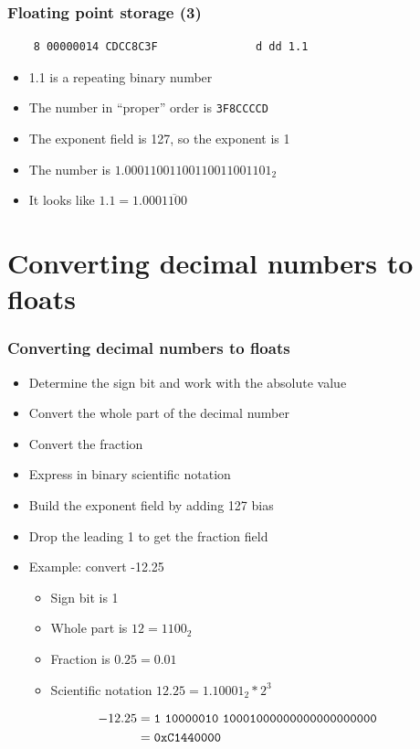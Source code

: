 \documentclass{beamer}
\begin{document}
\begin{frame}[fragile]
    \frametitle{Floating point storage (3)}
    \begin{verbatim}
    8 00000014 CDCC8C3F               d dd 1.1
    \end{verbatim}
    \begin{itemize}
        \item 1.1 is a repeating binary number
        \item The number in ``proper'' order is {\tt 3F8CCCCD}
        \item The exponent field is 127, so the exponent is 1
        \item The number is $1.00011001100110011001101_2$
        \item It looks like $1.1 = 1.000\overline{1100}$
    \end{itemize}
\end{frame}

\section{Converting decimal numbers to floats}

\begin{frame}
    \frametitle{Converting decimal numbers to floats}
    \begin{itemize}
        \item Determine the sign bit and work with the absolute value
        \item Convert the whole part of the decimal number
        \item Convert the fraction
        \item Express in binary scientific notation
        \item Build the exponent field by adding 127 bias
        \item Drop the leading 1 to get the fraction field
        \item Example: convert -12.25
        \begin{itemize}
            \item Sign bit is 1
            \item Whole part is $12 = 1100_2$
            \item Fraction is $0.25 = 0.01$
            \item Scientific notation $12.25 = 1.10001_2 * 2^3$
        \end{itemize}
    \end{itemize}
        \begin{align*}
                -12.25 &= {\tt 1\ 10000010\ 10001000000000000000000} \\
                    &= {\tt 0xC1440000}
        \end{align*}
\end{frame}
\end{document}
